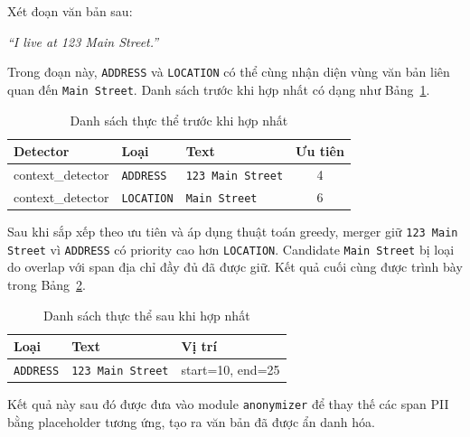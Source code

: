 Xét đoạn văn bản sau:

\begin{center}
    \textit{``I live at 123 Main Street.''}
\end{center}

Trong đoạn này, \texttt{ADDRESS} và \texttt{LOCATION} có thể cùng nhận diện
vùng văn bản liên quan đến \texttt{Main Street}. Danh sách trước khi hợp nhất
có dạng như Bảng~\ref{tab:overlap_before}.

\begin{table}[H]
    \centering
    \caption{Danh sách thực thể trước khi hợp nhất}
    \label{tab:overlap_before}
    \renewcommand{\arraystretch}{1.3}
    \begin{tabular}{l l l c}
        \toprule
        \textbf{Detector} & \textbf{Loại}     & \textbf{Text}            & \textbf{Ưu tiên} \\
        \midrule
        context\_detector & \texttt{ADDRESS}  & \texttt{123 Main Street} & 4                \\
        context\_detector & \texttt{LOCATION} & \texttt{Main Street}     & 6                \\
        \bottomrule
    \end{tabular}
\end{table}

Sau khi sắp xếp theo ưu tiên và áp dụng thuật toán greedy, merger giữ
\texttt{123 Main Street} vì \texttt{ADDRESS} có priority cao hơn
\texttt{LOCATION}. Candidate \texttt{Main Street} bị loại do overlap với span
địa chỉ đầy đủ đã được giữ.
Kết quả cuối cùng được trình bày trong Bảng~\ref{tab:overlap_after}.

\begin{table}[H]
    \centering
    \caption{Danh sách thực thể sau khi hợp nhất}
    \label{tab:overlap_after}
    \renewcommand{\arraystretch}{1.3}
    \begin{tabular}{l l l}
        \toprule
        \textbf{Loại}    & \textbf{Text}            & \textbf{Vị trí}  \\
        \midrule
        \texttt{ADDRESS} & \texttt{123 Main Street} & start=10, end=25 \\
        \bottomrule
    \end{tabular}
\end{table}

Kết quả này sau đó được đưa vào module \texttt{anonymizer} để thay thế các
span PII bằng placeholder tương ứng, tạo ra văn bản đã được ẩn danh hóa.
